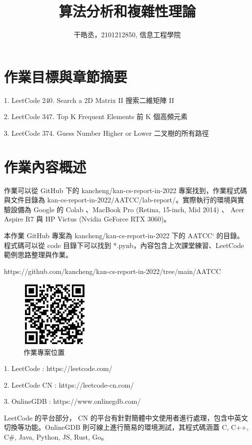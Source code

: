 \documentclass[10pt,UTF8]{ctexart}
\title{算法分析和複雜性理論}
\author{干皓丞，2101212850, 信息工程學院}
\begin{document}
\maketitle


\section{作業目標與章節摘要}

1. LeetCode 240. Search a 2D Matrix II 搜索二維矩陣 II

2. LeetCode 347. Top K Frequent Elements 前 K 個高頻元素

3. LeetCode 374. Guess Number Higher or Lower 二叉樹的所有路徑


\section{作業內容概述}

作業可以從 GitHub 下的 kancheng/kan-cs-report-in-2022 專案找到，作業程式碼與文件目錄為 kan-cs-report-in-2022/AATCC/lab-report/。實際執行的環境與實驗設備為 Google 的 Colab 、MacBook Pro (Retina, 15-inch, Mid 2014) 、 Acer Aspire R7 與 HP Victus (Nvidia GeForce RTX 3060)。

本作業 GitHub 專案為 kancheng/kan-cs-report-in-2022 下的 AATCC` 的目錄。程式碼可以從 code 目錄下可以找到 *.pynb，內容包含上次課堂練習、LeetCode 範例思路整理與作業。

https://github.com/kancheng/kan-cs-report-in-2022/tree/main/AATCC

\begin{figure}[H]
\centering 
\includegraphics[width=0.30\textwidth]{aatccqr.png} 
\caption{作業專案位置}
\label{Test}
\end{figure}


1. LeetCode : https://leetcode.com/

2. LeetCode CN : https://leetcode-cn.com/

3. OnlineGDB : https://www.onlinegdb.com/ 

LeetCode 的平台部分， CN 的平台有針對簡體中文使用者進行處理，包含中英文切換等功能。OnlineGDB 則可線上進行簡易的環境測試，其程式碼涵蓋 C, C++, C\#, Java, Python, JS, Rust, Go。
\end{document}
